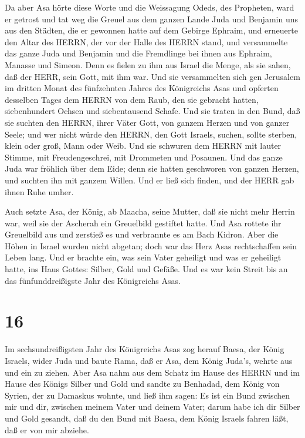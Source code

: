 Da aber Asa hörte diese Worte und die Weissagung Odeds, des
Propheten, ward er getrost und tat weg die Greuel aus dem ganzen Lande
Juda und Benjamin uns aus den Städten, die er gewonnen hatte auf dem
Gebirge Ephraim, und erneuerte den Altar des HERRN, der vor der Halle
des HERRN stand,  und versammelte das ganze Juda und
Benjamin und die Fremdlinge bei ihnen aus Ephraim, Manasse und Simeon.
Denn es fielen zu ihm aus Israel die Menge, als sie sahen, daß der HERR,
sein Gott, mit ihm war.  Und sie versammelten sich gen
Jerusalem im dritten Monat des fünfzehnten Jahres des Königreichs Asas
 und opferten desselben Tages dem HERRN von dem Raub, den
sie gebracht hatten, siebenhundert Ochsen und siebentausend Schafe.
 Und sie traten in den Bund, daß sie suchten den HERRN,
ihrer Väter Gott, von ganzem Herzen und von ganzer Seele; 
und wer nicht würde den HERRN, den Gott Israels, suchen, sollte sterben,
klein oder groß, Mann oder Weib.  Und sie schwuren dem
HERRN mit lauter Stimme, mit Freudengeschrei, mit Drommeten und
Posaunen.  Und das ganze Juda war fröhlich über dem Eide;
denn sie hatten geschworen von ganzen Herzen, und suchten ihn mit ganzem
Willen. Und er ließ sich finden, und der HERR gab ihnen Ruhe umher.

 Auch setzte Asa, der König, ab Maacha, seine Mutter, daß
sie nicht mehr Herrin war, weil sie der Ascherah ein Greuelbild
gestiftet hatte. Und Asa rottete ihr Greuelbild aus und zerstieß es und
verbrannte es am Bach Kidron.  Aber die Höhen in Israel
wurden nicht abgetan; doch war das Herz Asas rechtschaffen sein Leben
lang.  Und er brachte ein, was sein Vater geheiligt und was
er geheiligt hatte, ins Haus Gottes: Silber, Gold und Gefäße.
 Und es war kein Streit bis an das fünfunddreißigste Jahr
des Königreichs Asas.

\hypertarget{section-15}{%
\section{16}\label{section-15}}

 Im sechsundreißigsten Jahr des Königreichs Asas zog herauf
Baesa, der König Israels, wider Juda und baute Rama, daß er Asa, dem
König Juda's, wehrte aus und ein zu ziehen.  Aber Asa nahm
aus dem Schatz im Hause des HERRN und im Hause des Königs Silber und
Gold und sandte zu Benhadad, dem König von Syrien, der zu Damaskus
wohnte, und ließ ihm sagen:  Es ist ein Bund zwischen mir
und dir, zwischen meinem Vater und deinem Vater; darum habe ich dir
Silber und Gold gesandt, daß du den Bund mit Baesa, dem König Israels
fahren läßt, daß er von mir abziehe.

